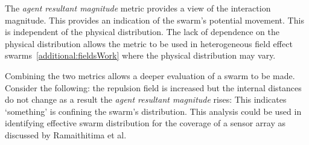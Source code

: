 The \textit{agent resultant magnitude} metric provides a view of the interaction magnitude. This provides an indication of the swarm's potential movement. This is independent of the physical distribution. The lack of dependence on the physical distribution allows the metric to be used in heterogeneous field effect swarms~\autoref{additional:fieldsWork} where the physical distribution may vary. 

Combining the two metrics allows a deeper evaluation of a swarm to be made. Consider the following: the repulsion field is increased but the internal distances do not change as a result the \textit{agent resultant magnitude} rises: This indicates `something' is confining the swarm's distribution. This analysis could be used in identifying effective swarm distribution for the coverage of a sensor array as discussed by Ramaithitima et al.~\cite{RWBK:15}

